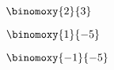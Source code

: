 \documentclass[10pt,a4paper]{article}
\begin{document}
	$\binomoxy{2}{3}$
	
	
	$\binomoxy{1}{-5}$
	
	
	$\binomoxy{-1}{-5}$
\end{document}
